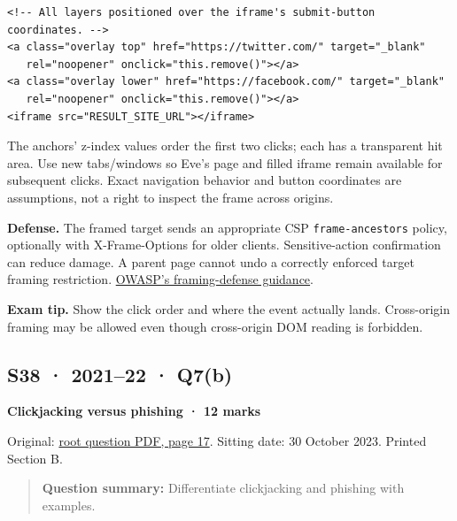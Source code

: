 \documentclass[11pt,a4paper]{article}
\begin{document}
\begin{Verbatim}[breaklines=true,breakanywhere=true,fontsize=\small,frame=single,rulecolor=\color{PanelBorder}]
<!-- All layers positioned over the iframe's submit-button coordinates. -->
<a class="overlay top" href="https://twitter.com/" target="_blank"
   rel="noopener" onclick="this.remove()"></a>
<a class="overlay lower" href="https://facebook.com/" target="_blank"
   rel="noopener" onclick="this.remove()"></a>
<iframe src="RESULT_SITE_URL"></iframe>
\end{Verbatim}

The anchors’ z-index values order the first two clicks; each has a transparent hit area. Use new tabs/\allowbreak{}windows so Eve’s page and filled iframe remain available for subsequent clicks. Exact navigation behavior and button coordinates are assumptions,\allowbreak{} not a right to inspect the frame across origins.


\textbf{Defense.} The framed target sends an appropriate CSP \texttt{frame-ancestors} policy,\allowbreak{} optionally with X-Frame-Options for older clients. Sensitive-action confirmation can reduce damage. A parent page cannot undo a correctly enforced target framing restriction. \href{https://cheatsheetseries.owasp.org/cheatsheets/Clickjacking_Defense_Cheat_Sheet.html}{OWASP’s framing-defense guidance}.



{\color{ForestGreen}\textbf{Exam tip.} Show the click order and where the event actually lands. Cross-origin framing may be allowed even though cross-origin DOM reading is forbidden.}




\clearpage
\subsection{S38 · 2021–22 · Q7(b)}\label{s38}

\textbf{Clickjacking versus phishing · 12 marks}


Original: \href{../../CSE405-Security_Merged.pdf\#page=17}{root question PDF,\allowbreak{} page 17}. Sitting date: 30 October 2023. Printed Section B.



\begin{quote}\small

\textbf{Question summary:} Differentiate clickjacking and phishing with examples.



\end{quote}
\end{document}

